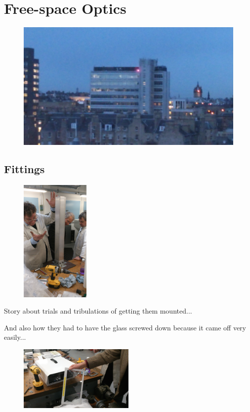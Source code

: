 
\section{Free-space Optics}
\label{sec:fso}

\begin{figure}
  \includegraphics[width=\textwidth]{at-laser.jpg}
\end{figure}

\subsection{Fittings}
\label{sec:fittings}

\begin{figure}
  \includegraphics[angle=-90,width=0.3\textwidth]{tada}
\end{figure}
Story about trials and tribulations of getting them mounted...

And also how they had to have the glass screwed down because it came
off very easily...

\begin{figure}[h]
  \begin{center}
    \includegraphics[width=0.5\textwidth]{faulty}
  \end{center}
\end{figure}

